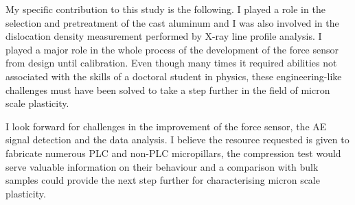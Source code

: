 My specific contribution to this study is the following. I played a role in the selection and pretreatment of the cast aluminum and I was also involved in the dislocation density measurement performed by X-ray line profile analysis. I played a major role in the whole process of the development of the force sensor from design until calibration. Even though many times it required abilities not associated with the skills of a doctoral student in physics, these engineering-like challenges must have been solved to take a step further in the field of micron scale plasticity.

I look forward for challenges in the improvement of the force sensor, the AE signal detection and the data analysis. I believe the resource requested is given to fabricate numerous PLC and non-PLC micropillars, the compression test would serve valuable information on their behaviour and a comparison with bulk samples could provide the next step further for characterising micron scale plasticity.

